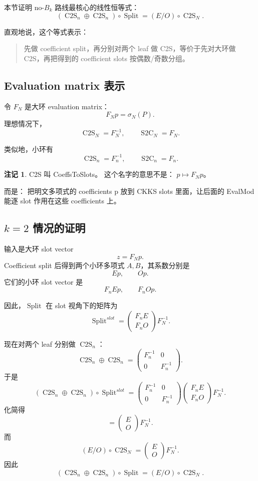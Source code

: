 \documentclass[UTF8,11pt]{ctexart}
\theoremstyle{definition}
\newtheorem{remark}{注记}
\newcommand{\CtwoS}{\operatorname{C2S}}
\newcommand{\StwoC}{\operatorname{S2C}}
\newcommand{\Split}{\operatorname{Split}}
\begin{document}
本节证明 no-\(B_k\) 路线最核心的线性恒等式：
\[
(\CtwoS_n\oplus \CtwoS_n)\circ \Split
=
(E/O)\circ \CtwoS_N.
\]

直观地说，这个等式表示：

\begin{quote}
先做 coefficient split，再分别对两个 leaf 做 C2S，等价于先对大环做 C2S，再把得到的 coefficient slots 按偶数/奇数分组。
\end{quote}

\subsection{Evaluation matrix 表示}

令 \(F_N\) 是大环 evaluation matrix：
\[
F_Np=\sigma_N(P).
\]
理想情况下，
\[
\CtwoS_N=F_N^{-1},
\qquad
\StwoC_N=F_N.
\]

类似地，小环有
\[
\CtwoS_n=F_n^{-1},
\qquad
\StwoC_n=F_n.
\]

\begin{remark}
    C2S 叫 CoeffsToSlots。 这个名字的意思不是： $p \mapsto F_N p$。
    
    而是：
    把明文多项式的 coefficients p 放到 CKKS slots 里面，让后面的 EvalMod 能逐 slot 作用在这些 coefficients 上。
\end{remark}

\subsection{\(k=2\) 情况的证明}

输入是大环 slot vector
\[
z=F_Np.
\]
Coefficient split 后得到两个小环多项式 \(A,B\)，其系数分别是
\[
Ep,\qquad Op.
\]
它们的小环 slot vector 是
\[
F_nEp,\qquad F_nOp.
\]

因此，\(\Split\) 在 slot 视角下的矩阵为
\[
\Split^{slot}
=
\begin{pmatrix}
F_nE\\
F_nO
\end{pmatrix}
F_N^{-1}.
\]

现在对两个 leaf 分别做 \(\CtwoS_n\)：
\[
\CtwoS_n\oplus\CtwoS_n
=
\begin{pmatrix}
F_n^{-1} & 0\\
0 & F_n^{-1}
\end{pmatrix}.
\]
于是
\[
(\CtwoS_n\oplus\CtwoS_n)\circ\Split^{slot}
=
\begin{pmatrix}
F_n^{-1} & 0\\
0 & F_n^{-1}
\end{pmatrix}
\begin{pmatrix}
F_nE\\
F_nO
\end{pmatrix}
F_N^{-1}.
\]
化简得
\[
=
\begin{pmatrix}
E\\
O
\end{pmatrix}
F_N^{-1}.
\]
而
\[
(E/O)\circ\CtwoS_N
=
\begin{pmatrix}
E\\
O
\end{pmatrix}
F_N^{-1}.
\]
因此
\[
\boxed{
(\CtwoS_n\oplus\CtwoS_n)\circ\Split
=
(E/O)\circ\CtwoS_N.
}
\]
\end{document}
